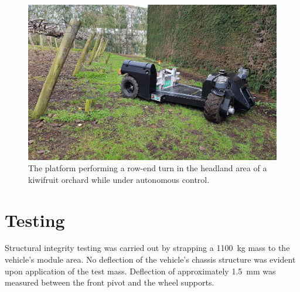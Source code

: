 \documentclass[preprint,authoryear,12pt]{elsarticle}
\begin{document}
    \begin{figure}[htb]
        \centering
        \includegraphics[width=\linewidth]{imgs/photos/suzy_turning.jpg}
        \caption{
            The platform performing a row-end turn in the headland area of a kiwifruit orchard while under autonomous control.
        }
        \label{fig:suzy_turning}
    \end{figure}

\section{Testing}
\label{sub:testing}


    Structural integrity testing was carried out by strapping a \SI{1100}{\kilo\gram} mass to the vehicle's module area.
    No deflection of the vehicle's chassis structure was evident upon application of the test mass.
    Deflection of approximately \SI{1.5}{\milli\meter} was measured between the front pivot and the wheel supports.
\end{document}
